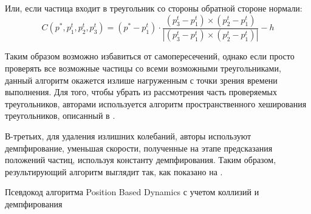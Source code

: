 	Или, если частица входит в треугольник со стороны обратной стороне нормали:
	\begin{equation}
		C(p^*, p_1^t, p_2^t, p_3^t) = (p^* - p_1^t) \cdot \frac{(p_3^t - p_1^t) \times (p_2^t - p_1^t)}{|(p_3^t - p_1^t) \times (p_2^t - p_1^t)|} - h
	\end{equation}	
	
	Таким образом возможно избавиться от самопересечений, однако если просто проверять все возможные частицы со всеми возможными треугольниками, данный алгоритм окажется излише нагруженным с точки зрения времени выполнения. Для того, чтобы убрать из рассмотрения часть проверяемых треугольников, авторами используется алгоритм пространственного хеширования треугольников, описанный в \cite{teschner2003optimized}.
	
	В-третьих, для удаления излишних колебаний, авторы используют демпфирование, уменьшая скорости, полученные на этапе предсказания положений частиц, используя константу демпфирования. Таким образом, результирующий алгоритм выглядит так, как показано на .
	
	\begin{algorithm} %
		\nonl{}
		\caption{Псевдокод алгоритма Position Based Dynamics с учетом коллизий и демпфирования}\label{alg:PositionBasedDynamics2}
	\end{algorithm}
	\FloatBarrier
	
